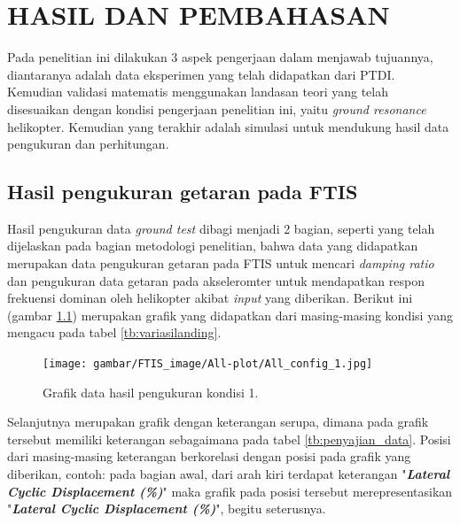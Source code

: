 \chapter{HASIL DAN PEMBAHASAN}
\label{chap:hasil dan pembahasan}


Pada penelitian ini dilakukan 3 aspek pengerjaan dalam menjawab tujuannya, diantaranya adalah data eksperimen yang telah didapatkan dari PTDI. Kemudian validasi matematis menggunakan landasan teori yang telah disesuaikan dengan kondisi pengerjaan penelitian ini, yaitu \textit{ground resonance} helikopter. Kemudian yang terakhir adalah simulasi untuk mendukung hasil data pengukuran dan perhitungan. 

\section{Hasil pengukuran getaran pada FTIS}

Hasil pengukuran data \textit{ground test} dibagi menjadi 2 bagian, seperti yang telah dijelaskan pada bagian metodologi penelitian, bahwa data yang didapatkan merupakan data pengukuran getaran pada FTIS untuk mencari \textit{damping ratio} dan pengukuran data getaran pada akseleromter untuk mendapatkan respon frekuensi dominan oleh helikopter akibat \textit{input} yang diberikan. Berikut ini (gambar \ref{fig:condition_1}) merupakan grafik yang didapatkan dari masing-masing kondisi yang mengacu pada tabel \ref{tb:variasilanding}.

\begin{figure}[H]
	\centering
	\texttt{[image: gambar/FTIS\_image/All-plot/All\_config\_1.jpg]}
	\caption{Grafik data hasil pengukuran kondisi 1.}
	\label{fig:condition_1}
\end{figure}

Selanjutnya merupakan grafik dengan keterangan serupa, dimana pada grafik tersebut memiliki keterangan sebagaimana pada tabel \ref{tb:penyajian_data}. Posisi dari masing-masing keterangan berkorelasi dengan posisi pada grafik yang diberikan, contoh: pada bagian awal, dari arah kiri terdapat keterangan "\textbf{\textit{Lateral Cyclic Displacement (\%)}}" maka grafik pada posisi tersebut merepresentasikan "\textbf{\textit{Lateral Cyclic Displacement (\%)}}", begitu seterusnya.

